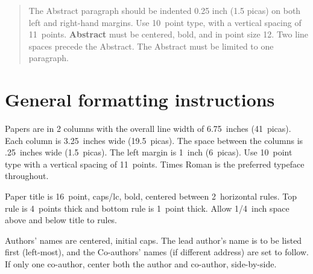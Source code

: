 \documentclass[twoside]{article}
\begin{document}



\begin{abstract}
The Abstract paragraph should be indented 0.25 inch (1.5 picas) on both left and right-hand margins. Use  10~point type, with a vertical
spacing of 11~points.  {\bf Abstract} must be centered, bold, and in  point size 12. Two line spaces precede the Abstract. The Abstract
must be limited to one paragraph.
\end{abstract}

\section{General formatting instructions}

Papers are in 2 columns with the overall line width of 6.75~inches (41~picas). Each column is 3.25~inches wide (19.5~picas).  The space
between the columns is .25~inches wide (1.5~picas).  The left margin is 1~inch (6~picas).  Use 10~point type with a vertical spacing of
11~points. Times Roman is the preferred typeface throughout.

Paper title is 16~point, caps/lc, bold, centered between 2~horizontal rules.  Top rule is 4~points thick and bottom rule is 1~point thick.
Allow 1/4~inch space above and below title to rules.

Authors' names are centered, initial caps.  The lead author's name is to be listed first (left-most), and the Co-authors' names (if
different address) are set to follow.  If only one co-author, center both the author and co-author, side-by-side.
\end{document}
